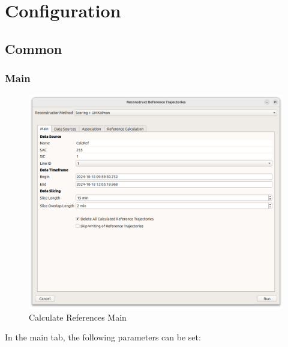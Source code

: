 \section{Configuration}

\subsection{Common}

\subsubsection{Main}

\begin{figure}[H]
    \center
      \includegraphics[width=16cm]{figures/dialog_main.png}
    \caption{Calculate References Main}
\end{figure}

In the main tab, the following parameters can be set:

